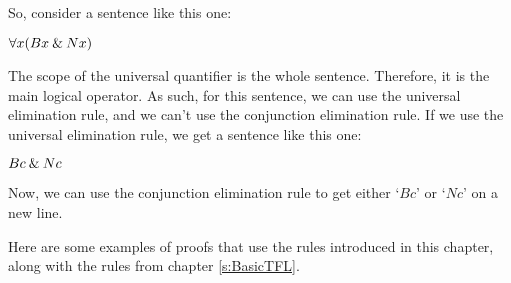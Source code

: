 So, consider a sentence like this one:

\begin{ebullet}
\item[] $\forall x(Bx \mathbin{\&} Nx)$
\end{ebullet}
The scope of the universal quantifier is the whole sentence. Therefore, it is the main logical operator. As such, for this sentence, we can use the universal elimination rule, and we can't use the conjunction elimination rule. If we use the universal elimination rule, we get a sentence like this one:
\begin{ebullet}
\item[] $Bc \mathbin{\&} Nc$
\end{ebullet}
Now, we can use the conjunction elimination rule to get either `$Bc$' or `$Nc$' on a new line. %

Here are some examples of proofs that use the rules introduced in this chapter, along with the rules from chapter \ref{s:BasicTFL}.
\bigskip

